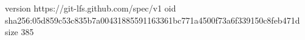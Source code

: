 version https://git-lfs.github.com/spec/v1
oid sha256:05d859c53c835b7a00431885591163361bc771a4500f73a6f339150c8feb471d
size 385
